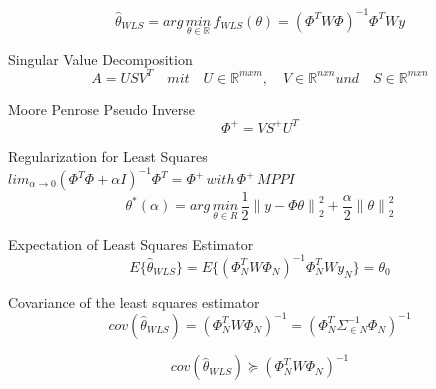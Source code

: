 \begin{equation*}
{ \hat{\theta} }_{ WLS }=arg\, \underset{ \theta \in \mathbb{R} }{ min }\,{f  }_{WLS  }(\theta)={ ({\Phi}^{T}W\Phi) }^{ -1 }{\Phi}^{T} Wy
\end{equation*}


Singular Value Decomposition
\begin{equation*}
A=US{ V }^{ T }\quad mit\quad U\in\mathbb{{R}}^{mxm}, \quad V\in\mathbb{{R}}^{nxn} und \quad S\in\mathbb{{R}}^{mxn}
\end{equation*}

Moore Penrose Pseudo Inverse
\begin{equation*}
{ \Phi  }^{ + }=V{ S }^{+}{U}^{T}
\end{equation*}

Regularization for Least Squares\\
\( { lim }_{ \alpha \rightarrow 0 }{ ({ \Phi  }^{ T }\Phi +\alpha { I }) }^{ -1 }{ \Phi  }^{ T }={ \Phi  }^{ + }\, with\,{ \Phi  }^{ + }\, MPPI \)
\begin{equation*}
{ \theta  }^{ * }(\alpha )=arg\, \underset { \theta \in { R } }{ min } \, \frac { 1 }{ 2 } {\parallel y-\Phi\theta \parallel}_{2}^{2}+\frac { \alpha }{ 2 } {\parallel \theta\parallel}_{2}^{2}
\end{equation*}

Expectation of Least Squares Estimator
\begin{equation*}
{ E }\{ { \hat { \theta  } _{ WLS } }\} { ={ E }\{ ({ \Phi  }_{ N }^{ T }W{ \Phi  }_{ N }) }^{ -1 }{ \Phi  }_{ N }^{ T }W{ y }_{ N }\} ={\theta}_{0}
\end{equation*}


Covariance of the least squares estimator
\begin{equation*}
cov({ \hat { \theta  } _{ WLS } }){ =({ \Phi  }_{ N }^{ T }W{ \Phi  }_{ N }) }^{ -1 }{ =({ \Phi  }_{ N }^{ T }{\Sigma}_{\in N }^{ -1 }{ \Phi  }_{ N }) }^{ -1 }
\end{equation*}

\begin{equation*}
cov({ \hat { \theta  } _{ WLS } }){ \succeq ({ \Phi  }_{ N }^{ T }W{ \Phi  }_{ N }) }^{ -1 }
\end{equation*}


